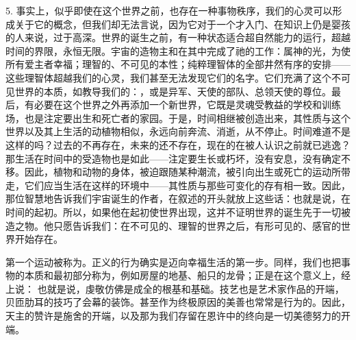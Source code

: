 5. 事实上，似乎即使在这个世界之前，也存在一种事物秩序，我们的心灵可以形成关于它的概念，但我们却无法言说，因为它对于一个才入门、在知识上仍是婴孩的人来说，过于高深。世界的诞生之前，有一种状态适合超自然能力的运行，超越时间的界限，永恒无限。宇宙的造物主和在其中完成了祂的工作：属神的光，为使所有爱主者幸福；理智的、不可见的本性；纯粹理智体的全部井然有序的安排——这些理智体超越我们的心灵，我们甚至无法发现它们的名字。它们充满了这个不可见世界的本质，如教导我们的：，或是异军、天使的部队、总领天使的尊位。最后，有必要在这个世界之外再添加一个新世界，它既是灵魂受教益的学校和训练场，也是注定要出生和死亡者的家园。于是，时间相继被创造出来，其性质与这个世界以及其上生活的动植物相似，永远向前奔流、消逝，从不停止。时间难道不是这样的吗？过去的不再存在，未来的还不存在，现在的在被人认识之前就已逃逸？那生活在时间中的受造物也是如此——注定要生长或朽坏，没有安息，没有确定不移。因此，植物和动物的身体，被迫跟随某种潮流，被引向出生或死亡的运动所带走，它们应当生活在这样的环境中——其性质与那些可变化的存有相一致。因此，那位智慧地告诉我们宇宙诞生的作者，在叙述的开头就放上这些话：也就是说，在时间的起初。所以，如果他在起初使世界出现，这并不证明世界的诞生先于一切被造之物。他只愿告诉我们：在不可见的、理智的世界之后，有形可见的、感官的世界开始存在。\par

第一个运动被称为。正义的行为确实是迈向幸福生活的第一步。同样，我们也把事物的本质和最初部分称为，例如房屋的地基、船只的龙骨；正是在这个意义上，经上说：  也就是说，虔敬仿佛是成全的根基和基础。技艺也是艺术家作品的开端，贝匝肋耳的技巧了会幕的装饰。甚至作为终极原因的美善也常常是行为的。因此，天主的赞许是施舍的开端，以及那为我们存留在恩许中的终向是一切美德努力的开端。\par

